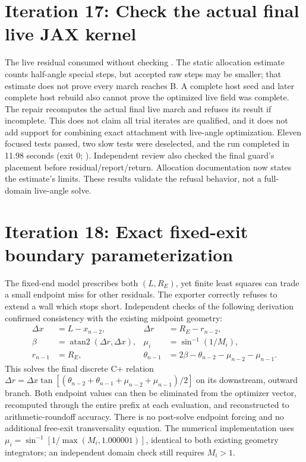 \section{Iteration 17: Check the actual final live JAX kernel}
The live residual consumed  without checking
. The static allocation estimate counts half-angle
special steps, but accepted raw steps may be smaller; that estimate does
not prove every march reaches B. A complete host seed and later complete
host rebuild also cannot prove the optimized live field was complete.
The repair recomputes the actual final live march and refuses its
result if incomplete. This does not claim all trial iterates are qualified,
and it does not add support for combining exact attachment with live-angle
optimization. Eleven focused tests passed, two slow tests were deselected,
and the run completed in 11.98 seconds (exit 0;
). Independent review also checked the final
guard's placement before residual/report/return. Allocation documentation
now states the estimate's limits. These results validate the refusal
behavior, not a full-domain live-angle solve.

\section{Iteration 18: Exact fixed-exit boundary parameterization}
The fixed-end model prescribes both $(L,R_E)$, yet finite least squares
can trade a small endpoint miss for other residuals. The exporter correctly
refuses to extend a wall which stops short. Independent checks of the
following derivation confirmed consistency with the existing midpoint geometry:
\begin{align}
\Delta x &= L-x_{n-2}, & \Delta r &= R_E-r_{n-2},\\
\beta &= \operatorname{atan2}(\Delta r,\Delta x), &
\mu_i &= \sin^{-1}(1/M_i),\\
r_{n-1} &= R_E, &
\theta_{n-1} &= 2\beta-\theta_{n-2}-\mu_{n-2}-\mu_{n-1}.
\end{align}
This solves the final discrete C+ relation
$\Delta r=\Delta x\tan[(\theta_{n-2}+\theta_{n-1}+
\mu_{n-2}+\mu_{n-1})/2]$ on its downstream, outward branch.
Both endpoint values can then be eliminated from the optimizer vector,
recomputed through the entire prefix at each evaluation, and reconstructed
to arithmetic-roundoff accuracy. There is no post-solve endpoint forcing
and no additional free-exit transversality equation.
The numerical implementation uses
$\mu_i=\sin^{-1}[1/\max(M_i,1.000001)]$, identical to both existing
geometry integrators; an independent domain check still requires $M_i>1$.

